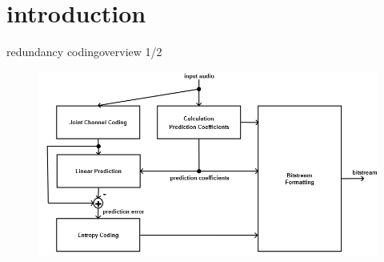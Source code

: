 



\subtitle{Part 24: Redundancy Coding}


	

\section[overview \& summary]{introduction}

	\begin{frame}{redundancy coding}{overview 1/2}
		\begin{figure}
			\centering
				\includegraphics[scale=0.4]{Graph/redundancycoding}
		\end{figure}
	\end{frame}

